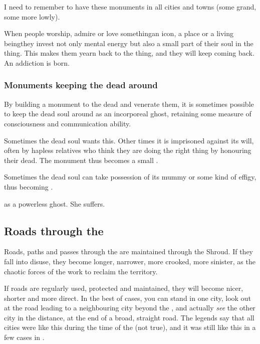 I need to remember to have these monuments in all cities and towns (some grand, some more lowly).

When people worship, admire or love something\dash an icon, a place or a living being\dash they invest not only mental energy but also a small part of their soul in the thing. This makes them yearn back to the thing, and they will keep coming back. An addiction is born.





\subsubsection{Monuments keeping the dead around}
By building a monument to the dead and venerate them, it is sometimes possible to keep the dead soul around as an incorporeal ghost, retaining some measure of consciousness and communication ability. 

Sometimes the dead soul wants this. Other times it is imprisoned against its will, often by hapless relatives who think they are doing the right thing by honouring their dead.
The monument thus becomes a small \carcer.

Sometimes the dead soul can take possession of its mummy or some kind of effigy, thus becoming .

 as a powerless ghost. She suffers.







\subsection{Roads through the \Wylde}
Roads, paths and passes through the \Wylde{} are maintained through the Shroud. If they fall into disuse, they become longer, narrower, more crooked, more sinister, as the chaotic forces of the \Wylde{} work to reclaim the territory. 

If roads are regularly used, protected and maintained, they will become nicer, shorter and more direct. In the best of cases, you can stand in one city, look out at the road leading to a neighbouring city beyond the \Wylde{}, and actually \emph{see} the other city in the distance, at the end of a broad, straight road. The legends say that all cities were like this during the time of the  (not true), and it was still like this in a few cases in . 

